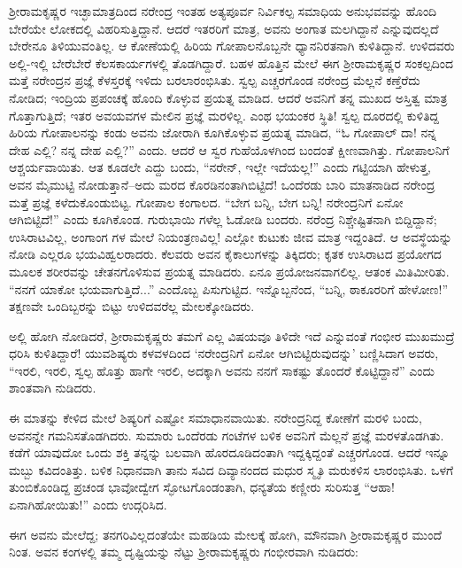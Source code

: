 ಶ್ರೀರಾಮಕೃಷ್ಣರ ಇಚ್ಛಾಮಾತ್ರದಿಂದ ನರೇಂದ್ರ ಇಂತಹ ಅತ್ಯಪೂರ್ವ ನಿರ್ವಿಕಲ್ಪ ಸಮಾಧಿಯ ಅನುಭವವನ್ನು ಹೊಂದಿ ಬೇರೆಯೇ ಲೋಕದಲ್ಲಿ ವಿಹರಿಸುತ್ತಿದ್ದಾನೆ. ಆದರೆ ಇತರರಿಗೆ ಮಾತ್ರ, ಅವನು ಅಂಗಾತ ಮಲಗಿದ್ದಾನೆ ಎನ್ನುವುದಲ್ಲದೆ ಬೇರೇನೂ ತಿಳಿಯುವಂತಿಲ್ಲ. ಆ ಕೋಣೆಯಲ್ಲಿ ಹಿರಿಯ ಗೋಪಾಲನೊಬ್ಬನೇ ಧ್ಯಾನನಿರತನಾಗಿ ಕುಳಿತಿದ್ದಾನೆ. ಉಳಿದವರು ಅಲ್ಲಿ-ಇಲ್ಲಿ ಬೇರೆಬೇರೆ ಕೆಲಸಕಾರ್ಯಗಳಲ್ಲಿ ತೊಡಗಿದ್ದಾರೆ. ಬಹಳ ಹೊತ್ತಿನ ಮೇಲೆ ಈಗ ಶ್ರೀರಾಮಕೃಷ್ಣರ ಸಂಕಲ್ಪದಿಂದ ಮತ್ತೆ ನರೇಂದ್ರನ ಪ್ರಜ್ಞೆ ಕೆಳಸ್ತರಕ್ಕೆ ಇಳಿದು ಬರಲಾರಂಭಿಸಿತು. ಸ್ವಲ್ಪ ಎಚ್ಚರಗೊಂಡ ನರೇಂದ್ರ ಮೆಲ್ಲನೆ ಕಣ್ತೆರೆದು ನೋಡಿದ; ಇಂದ್ರಿಯ ಪ್ರಪಂಚಕ್ಕೆ ಹೊಂದಿ ಕೊಳ್ಳುವ ಪ್ರಯತ್ನ ಮಾಡಿದ. ಆದರೆ ಅವನಿಗೆ ತನ್ನ ಮುಖದ ಅಸ್ತಿತ್ವ ಮಾತ್ರ ಗೊತ್ತಾಗುತ್ತಿದೆ; ಇತರ ಅವಯವಗಳ ಮೇಲಿನ ಪ್ರಜ್ಞೆ ಮರಳಿಲ್ಲ. ಎಂಥ ಭಯಂಕರ ಸ್ಥಿತಿ! ಸ್ವಲ್ಪ ದೂರದಲ್ಲಿ ಕುಳಿತಿದ್ದ ಹಿರಿಯ ಗೋಪಾಲನನ್ನು ಕಂಡು ಅವನು ಜೋರಾಗಿ ಕೂಗಿಕೊಳ್ಳುವ ಪ್ರಯತ್ನ ಮಾಡಿದ, “ಓ ಗೋಪಾಲ್ ದಾ! ನನ್ನ ದೇಹ ಎಲ್ಲಿ? ನನ್ನ ದೇಹ ಎಲ್ಲಿ?” ಎಂದು. ಆದರೆ ಆ ಸ್ವರ ಗುಹೆಯೊಳಗಿಂದ ಬಂದಂತೆ ಕ್ಷೀಣವಾಗಿತ್ತು. ಗೋಪಾಲನಿಗೆ ಆಶ್ಚರ್ಯವಾಯಿತು. ಆತ ಕೂಡಲೇ ಎದ್ದು ಬಂದು, “ನರೇನ್, ಇಲ್ಲೇ ಇದೆಯಲ್ಲ!” ಎಂದು ಗಟ್ಟಿಯಾಗಿ ಹೇಳುತ್ತ, ಅವನ ಮೈಮುಟ್ಟಿ ನೋಡುತ್ತಾನೆ–ಅದು ಮರದ ಕೊರಡಿನಂತಾಗಿಬಿಟ್ಟಿದೆ! ಒಂದೆರಡು ಬಾರಿ ಮಾತನಾಡಿದ ನರೇಂದ್ರ ಮತ್ತೆ ಪ್ರಜ್ಞೆ ಕಳೆದುಕೊಂಡುಬಿಟ್ಟ. ಗೋಪಾಲ ಕಂಗಾಲದ. “ಬೇಗ ಬನ್ನಿ, ಬೇಗ ಬನ್ನಿ! ನರೇಂದ್ರನಿಗೆ ಏನೋ ಆಗಿಬಿಟ್ಟಿದೆ!” ಎಂದು ಕೂಗಿಕೊಂಡ. ಗುರುಭಾಯಿ ಗಳೆಲ್ಲ ಓಡೋಡಿ ಬಂದರು. ನರೆಂದ್ರ ನಿಶ್ಚೇಷ್ಟಿತನಾಗಿ ಬಿದ್ದಿದ್ದಾನೆ; ಉಸಿರಾಟವಿಲ್ಲ, ಅಂಗಾಂಗ ಗಳ ಮೇಲೆ ನಿಯಂತ್ರಣವಿಲ್ಲ! ಎಲ್ಲೋ ಕುಟುಕು ಜೀವ ಮಾತ್ರ ಇದ್ದಂತಿದೆ. ಆ ಅವಸ್ಥೆಯನ್ನು ನೋಡಿ ಎಲ್ಲರೂ ಭಯವಿಹ್ವಲರಾದರು. ಕೆಲವರು ಅವನ ಕೈಕಾಲುಗಳನ್ನು ತಿಕ್ಕಿದರು; ಕೃತಕ ಉಸಿರಾಟದ ಪ್ರಯೋಗದ ಮೂಲಕ ಶರೀರವನ್ನು ಚೇತನಗೊಳಿಸುವ ಪ್ರಯತ್ನ ಮಾಡಿದರು. ಏನೂ ಪ್ರಯೋಜನವಾಗಲಿಲ್ಲ. ಆತಂಕ ಮಿತಿಮೀರಿತು. “ನನಗೆ ಯಾಕೋ ಭಯವಾಗುತ್ತಿದೆ...” ಎಂದೊಬ್ಬ ಪಿಸುಗುಟ್ಟಿದ. ಇನ್ನೊಬ್ಬನೆಂದ, “ಬನ್ನಿ, ಠಾಕೂರರಿಗೆ ಹೇಳೋಣ!” ತಕ್ಷಣವೇ ಒಂದಿಬ್ಬರನ್ನು ಬಿಟ್ಟು ಉಳಿದವರೆಲ್ಲ ಮೇಲಕ್ಕೋಡಿದರು.

ಅಲ್ಲಿ ಹೋಗಿ ನೋಡಿದರೆ, ಶ್ರೀರಾಮಕೃಷ್ಣರು ತಮಗೆ ಎಲ್ಲ ವಿಷಯವೂ ತಿಳಿದೇ ಇದೆ ಎನ್ನುವಂತೆ ಗಂಭೀರ ಮುಖಮುದ್ರೆ ಧರಿಸಿ ಕುಳಿತಿದ್ದಾರೆ! ಯುವಶಿಷ್ಯರು ಕಳವಳದಿಂದ ‘ನರೇಂದ್ರನಿಗೆ ಏನೋ ಆಗಿಬಿಟ್ಟಿರುವುದನ್ನು’ ಬಣ್ಣಿಸಿದಾಗ ಅವರು, “ಇರಲಿ, ಇರಲಿ, ಸ್ವಲ್ಪ ಹೊತ್ತು ಹಾಗೇ ಇರಲಿ, ಅದಕ್ಕಾಗಿ ಅವನು ನನಗೆ ಸಾಕಷ್ಟು ತೊಂದರೆ ಕೊಟ್ಟಿದ್ದಾನೆ” ಎಂದು ಶಾಂತವಾಗಿ ನುಡಿದರು.

ಈ ಮಾತನ್ನು ಕೇಳಿದ ಮೇಲೆ ಶಿಷ್ಯರಿಗೆ ಎಷ್ಟೋ ಸಮಾಧಾನವಾಯಿತು. ನರೇಂದ್ರನಿದ್ದ ಕೋಣೆಗೆ ಮರಳಿ ಬಂದು, ಅವನನ್ನೇ ಗಮನಿಸತೊಡಗಿದರು. ಸುಮಾರು ಒಂದೆರಡು ಗಂಟೆಗಳ ಬಳಿಕ ಅವನಿಗೆ ಮೆಲ್ಲನೆ ಪ್ರಜ್ಞೆ ಮರಳತೊಡಗಿತು. ಕಡೆಗೆ ಯಾವುದೋ ಒಂದು ಶಕ್ತಿ ತನ್ನನ್ನು ಬಲವಾಗಿ ಹೊರದೂಡಿದಂತಾಗಿ ಇದ್ದಕ್ಕಿದ್ದಂತೆ ಎಚ್ಚರಗೊಂಡ. ಆದರೆ ಇನ್ನೂ ಮಬ್ಬು ಕವಿದಂತಿತ್ತು. ಬಳಿಕ ನಿಧಾನವಾಗಿ ತಾನು ಸವಿದ ದಿವ್ಯಾನಂದದ ಮಧುರ ಸ್ಮೃತಿ ಮರುಕಳಿಸ ಲಾರಂಭಿಸಿತು. ಒಳಗೆ ತುಂಬಿಕೊಂಡಿದ್ದ ಪ್ರಚಂಡ ಭಾವೋದ್ವೇಗ ಸ್ಫೋಟಗೊಂಡಂತಾಗಿ, ಧನ್ಯತೆಯ ಕಣ್ಣೀರು ಸುರಿಸುತ್ತ “ಆಹಾ! ಏನಾಗಿಹೋಯಿತು!” ಎಂದು ಉದ್ಗರಿಸಿದ. 

ಈಗ ಅವನು ಮೇಲೆದ್ದ; ತನಗರಿವಿಲ್ಲದಂತೆಯೇ ಮಹಡಿಯ ಮೇಲಕ್ಕೆ ಹೋಗಿ, ಮೌನವಾಗಿ ಶ್ರೀರಾಮಕೃಷ್ಣರ ಮುಂದೆ ನಿಂತ. ಅವನ ಕಂಗಳಲ್ಲಿ ತಮ್ಮ ದೃಷ್ಟಿಯನ್ನು ನೆಟ್ಟು ಶ್ರೀರಾಮಕೃಷ್ಣರು ಗಂಭೀರವಾಗಿ ನುಡಿದರು:

